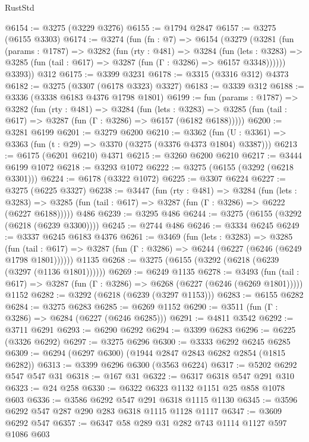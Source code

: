\begin{lexlean}{RustStd}
\begin{coremodule}
@6154 := @3275 (@3229 @3276)
@6155 := @1794 @2847
@6157 := @3275 (@6155 @3303)
@6174 := @3274
    (fun (fn : @7) =>
    @6154
      (@3279
        (@3281
          (fun (params : @1787) =>
          @3282
            (fun (rty : @481) =>
            @3284
              (fun (lets : @3283) =>
              @3285 (fun (tail : @617) => @3287 (fun (Γ : @3286) => @6157 @3348))))))
        @3393))
    @312
@6175 := @3399 @3231
@6178 := @3315 (@3316 @312) @4373
@6182 := @3275 (@3307 (@6178 @3323) @3327)
@6183 := @3339 @312
@6188 := @3336 (@3338 @6183 @4376 @1798 @1801)
@6199 := fun (params : @1787) =>
  @3282
    (fun (rty : @481) =>
    @3284
      (fun (lets : @3283) =>
      @3285 (fun (tail : @617) => @3287 (fun (Γ : @3286) => @6157 (@6182 @6188)))))
@6200 := @3281 @6199
@6201 := @3279 @6200
@6210 := @3362 (fun (U : @3361) => @3363 (fun (t : @29) => @3370 (@3275 (@3376 @4373 @1804) @3387)))
@6213 := @6175 (@6201 @6210) @4371
@6215 := @3260 @6200 @6210
@6217 := @3444 @6199 @1072
@6218 := @3293 @1072
@6222 := @3275 (@6155 (@3292 (@6218 @3301)))
@6224 := @6178 (@3322 @1072)
@6225 := @3307 @6224
@6227 := @3275 (@6225 @3327)
@6238 := @3447
    (fun (rty : @481) =>
    @3284
      (fun (lets : @3283) =>
      @3285 (fun (tail : @617) => @3287 (fun (Γ : @3286) => @6222 (@6227 @6188)))))
    @486
@6239 := @3295 @486
@6244 := @3275 (@6155 (@3292 (@6218 (@6239 @3300))))
@6245 := @2744 @486
@6246 := @3334 @6245
@6249 := @3337 @6245 @6183 @4376
@6261 := @3469
    (fun (lets : @3283) =>
    @3285
      (fun (tail : @617) => @3287 (fun (Γ : @3286) => @6244 (@6227 (@6246 (@6249 @1798 @1801))))))
    @1135
@6268 := @3275 (@6155 (@3292 (@6218 (@6239 (@3297 (@1136 @1801))))))
@6269 := @6249 @1135
@6278 := @3493
    (fun (tail : @617) => @3287 (fun (Γ : @3286) => @6268 (@6227 (@6246 (@6269 @1801)))))
    @1152
@6282 := @3292 (@6218 (@6239 (@3297 @1153)))
@6283 := @6155 @6282
@6284 := @3275 @6283
@6285 := @6269 @1152
@6290 := @3511 (fun (Γ : @3286) => @6284 (@6227 (@6246 @6285)))
@6291 := @4811 @3542
@6292 := @3711 @6291
@6293 := @6290 @6292
@6294 := @3399 @6283
@6296 := @6225 (@3326 @6292)
@6297 := @3275 @6296
@6300 := @3333 @6292 @6245 @6285
@6309 := @6294 (@6297 @6300) (@1944 @2847 @2843 @6282 @2854 (@1815 @6282))
@6313 := @3399 @6296 @6300 (@3563 @6224)
@6317 := @5202 @6292 @547 @547 @31
@6318 := @167 @31
@6322 := @6317 @6318 @547 @291 @310
@6323 := @24 @258
@6330 := @6322 @6323 @1132 @1151 @25 @858 @1078 @603
@6336 := @3586 @6292 @547 @291 @6318 @1115 @1130
@6345 := @3596 @6292 @547 @287 @290 @283 @6318 @1115 @1128 @1117
@6347 := @3609 @6292 @547
@6357 := @6347 @58 @289 @31 @282 @743 @1114 @1127 @597 @1086 @603

\end{coremodule}
\end{lexlean}
